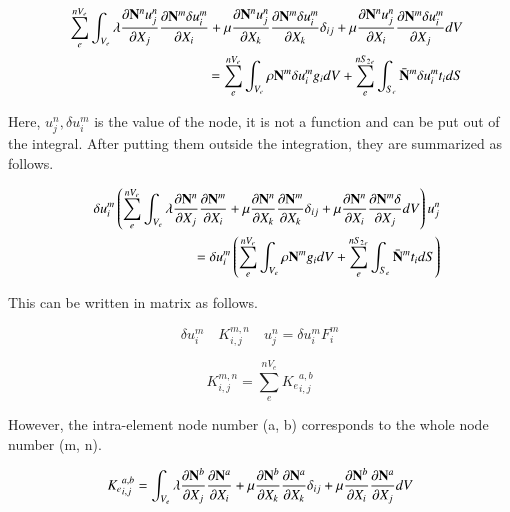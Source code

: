 \begin{eqnarray}
&&\sum_e^{nV_e}\int_{V_e} \lambda\frac{\partial \mathbf{N}^n u^n_j}{\partial X_j}\frac{\partial \mathbf{N}^m\delta u^m_i}{\partial X_i} + \mu\frac{\partial \mathbf{N}^n u^n_j}{\partial X_k}\frac{\partial \mathbf{N}^m \delta u^m_i}{\partial X_k}\delta_{ij} + \mu\frac{\partial \mathbf{N}^n u^n_j}{\partial X_i}\frac{\partial \mathbf{N}^m \delta u^m_i}{\partial X_j} dV \\ \nonumber
&&\;\;\;\; = \sum_e^{nV_e}\int_{V_e}\rho \mathbf{N}^m \delta u^m_i g_idV + \sum_e^{n{S_2}_e}\int_{S_e} \bar{\mathbf{N}}^m \delta u^m_i t_idS
\end{eqnarray}

Here, $u_j^n,\delta u_i^m$ is the value of the node, it is not a function and can be put out of the integral. After putting them outside the integration, they are summarized as follows.

\begin{eqnarray}
&& \delta u^m_i\left(\sum_e^{nV_e}\int_{V_e} \lambda\frac{\partial \mathbf{N}^n }{\partial X_j}\frac{\partial \mathbf{N}^m }{\partial X_i} + \mu\frac{\partial \mathbf{N}^n}{\partial X_k}\frac{\partial \mathbf{N}^m}{\partial X_k}\delta_{ij} + \mu\frac{\partial \mathbf{N}^n}{\partial X_i}\frac{\partial \mathbf{N}^m \delta}{\partial X_j} dV \right)u^n_j \\ \nonumber
&& \qquad \qquad =  \delta u^m_i \left( \sum_e^{nV_e}\int_{V_e}\rho \mathbf{N}^m g_idV + \sum_e^{n{S_2}_e}\int_{S_e} \bar{\mathbf{N}}^m t_idS\right)
\end{eqnarray}


This can be written in matrix as follows.

\begin{equation}
\delta u_i^m \quad K^{m,n}_{i,j} \quad u_j^n=\delta u_i^m F^m_i
\end{equation}

\begin{equation}
K^{m,n}_{i,j} = \sum_e^{nV_e}{K_e}^{a,b}_{i,j}
\end{equation}

However, the intra-element node number (a, b) corresponds to the whole node number (m, n).


\begin{tcolorbox}[title=element stiffness matrix of linear elastic body]
\begin{equation}
{K_e}^{a,b}_{i,j}=\int_{V_e} \lambda\frac{\partial \mathbf{N}^b }{\partial X_j}\frac{\partial \mathbf{N}^a }{\partial X_i} + \mu\frac{\partial \mathbf{N}^b}{\partial X_k}\frac{\partial \mathbf{N}^a}{\partial X_k}\delta_{ij} + \mu\frac{\partial \mathbf{N}^b}{\partial X_i}\frac{\partial \mathbf{N}^a}{\partial X_j} dV
\end{equation}
\end{tcolorbox}

